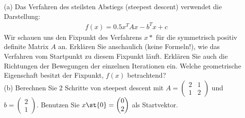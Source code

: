 \documentclass{scrartcl}
\begin{document}
	
	
	(a)
	Das Verfahren des steilsten Abstiegs (steepest descent) verwendet die Darstellung:
	\begin{align*}
	f(x) = 0.5x^TAx - b^Tx + c
	\end{align*}
	Wir schauen uns den Fixpunkt des Verfahrens $x*$ für die symmetrisch positiv definite Matrix $A$ an.
	\n 
	Erklären Sie anschaulich (keine Formeln!), wie das Verfahren vom Startpunkt zu diesem Fixpunkt läuft. Erklären Sie auch die Richtungen der Bewegungen der einzelnen Iterationen ein.
	\n 
	Welche geometrische Eigenschaft besitzt der Fixpunkt, $f(x)$ betrachtend?
	\lbreak
	\\
	(b)
	Berechnen Sie $2$ Schritte von steepest descent mit 
	$A= \begin{pmatrix}
	2 & 1\\
	1 & 2
	\end{pmatrix}$ und 
	$b= \begin{pmatrix}
	2 \\ 1
	\end{pmatrix}$.
	Benutzen Sie $x\st{0} = \begin{pmatrix}
	0 \\ 2
	\end{pmatrix}$ als Startvektor.
\end{document}
